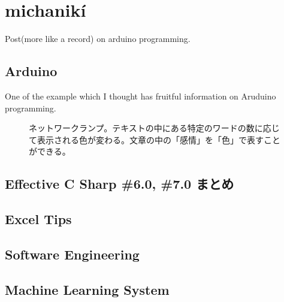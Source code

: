\documentclass[letterpaper,10pt,english]{sphinxmanual}
\let\sphinxpxdimen\pdfpxdimen\else\newdimen\sphinxpxdimen
\begin{document}
\chapter{michanikí}
\label{\detokenize{index:michaniki}}
\sphinxstepscope

\sphinxAtStartPar
Post(more like a record) on arduino programming.


\section{Arduino}
\label{\detokenize{src/kit/2020-03-13-arduino-network-lamp:arduino}}\label{\detokenize{src/kit/2020-03-13-arduino-network-lamp::doc}}
\sphinxAtStartPar
One of the example which I thought has fruitful information on Aruduino
programming.

\begin{figure}[htbp]
\centering
\capstart

\noindent\sphinxincludegraphics[width=320\sphinxpxdimen,height=480\sphinxpxdimen]{{network_lamp}.mp4}
\caption{ネットワークランプ。テキストの中にある特定のワードの数に応じて表示される色が変わる。文章の中の「感情」を「色」で表すことができる。}\label{\detokenize{src/kit/2020-03-13-arduino-network-lamp:figure}}\end{figure}

\sphinxstepscope


\section{Effective C Sharp \#6.0, \#7.0 まとめ}
\label{\detokenize{src/effectivecsharp/index:effective-c-sharp-6-0-7-0}}\label{\detokenize{src/effectivecsharp/index::doc}}
\sphinxstepscope


\section{Excel Tips}
\label{\detokenize{src/excel/index:excel-tips}}\label{\detokenize{src/excel/index::doc}}
\sphinxstepscope


\section{Software Engineering}
\label{\detokenize{src/softwareengineering/index:software-engineering}}\label{\detokenize{src/softwareengineering/index::doc}}
\sphinxstepscope


\section{Machine Learning System}
\label{\detokenize{src/MLApp/index:machine-learning-system}}\label{\detokenize{src/MLApp/index::doc}}
\end{document}
